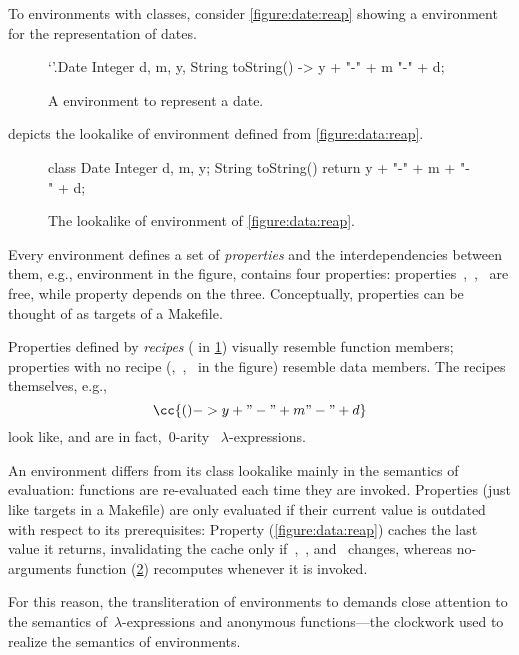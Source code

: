 To environments with classes, consider \cref{figure:date:reap} showing a \Reap
environment for the representation of dates.

\begin{figure}
  \caption{\label{figure:date}%
    A \Reap environment to represent a date.
  }
\begin{reap}
`'.Date {
  Integer d, m, y,
  String toString() -> y + "-" + m "-" + d;
}
\end{reap}
\end{figure}

 depicts the \Java {} lookalike of environment
 defined from \cref{figure:data:reap}.

\begin{figure}
  \caption{\label{figure:date:java}%
The \Java {} lookalike of environment
 of \cref{figure:data:reap}.
  }
\begin{java}
class Date {
  Integer d, m, y;
  String toString() { 
    return y + "-" + m + "-" + d; 
  }
}
\end{java}
\end{figure}

Every environment defines a set of \emph{properties} and the interdependencies
between them, e.g., environment  in the figure, contains four
properties: properties~,~,~ are free, while property
 depends on the three. Conceptually, properties can be thought of
as {targets} of a Makefile.

Properties defined by \emph{recipes} ( in \cref{figure:date})
visually resemble function members; properties with no recipe
(,~,~ in the figure) resemble data members.
The recipes themselves, e.g.,
\[
  \cc{() -> y + "-" + m "-" + d}
\]
look like, and are in fact,~$0$-arity \Java~$λ$-expressions.

An environment differs from its class lookalike mainly in the semantics of
evaluation: functions are re-evaluated each time they are invoked. Properties
(just like targets in a Makefile) are only evaluated if their current value is
outdated with respect to its prerequisites: Property 
(\cref{figure:data:reap}) caches the last value it returns, invalidating the
cache only if~,~, and~ changes, whereas no-arguments function
 (\cref{figure:date:java}) recomputes whenever it is invoked.

For this reason, the transliteration of environments to \Java demands close
attention to the semantics of~$λ$-expressions and anonymous functions---the
\Java clockwork used to realize the semantics of environments.

